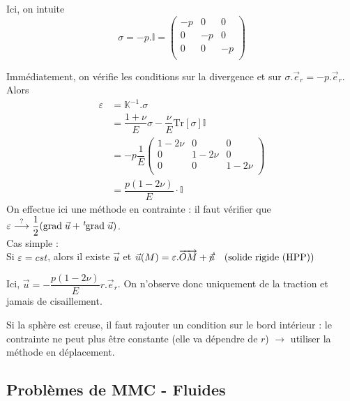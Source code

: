 \documentclass{article}
\newcommand{\grad}{\text{grad}\;}
\newcommand{\transpose}{\hspace{.1em}{}^t\hspace{-.1em}}
\begin{document}
\begin{enumerate}
Ici, on intuite
\[
\sigma = -p.\mathbb{I} =
\begin{pmatrix}
-p & 0 & 0\\
0 & -p & 0\\
0 & 0 & -p\\
\end{pmatrix}
\]

Immédiatement, on vérifie les conditions sur la divergence et sur $\sigma.\vec{e}_r = -p.\vec{e}_r$.
Alors 
\begin{align*}
\varepsilon & = \mathbb{K}^{-1}.\sigma\\
& = \dfrac{1+\nu}{E}\sigma - \dfrac{\nu}{E}\text{Tr}[\sigma]\mathbb{I}\\
& = -p\dfrac{1}{E}
\begin{pmatrix}
1 - 2\nu & 0 & 0\\
0 & 1-2\nu & 0\\
0 & 0 & 1-2\nu\\
\end{pmatrix}\\
& = \dfrac{p(1-2\nu)}{E}\cdot\mathbb{I}
\end{align*}
On effectue ici une méthode en contrainte : il faut vérifier que $\varepsilon \overset{?}{\longrightarrow} \dfrac{1}{2} (\grad\vec{u} + \transpose\grad\vec{u})$.\\
Cas simple :\\
Si $\varepsilon = cst$, alors il existe $\vec{u}$ et $\vec{u}(M) = \varepsilon.\overrightarrow{OM} + \cancel{\vec{u}} \quad \text{(solide rigide (HPP))}$

Ici, $\vec{u}=-\dfrac{p(1-2\nu)}{E}r.\vec{e}_r$. On n'observe donc uniquement de la traction et jamais de cisaillement.
\bigskip

Si la sphère est creuse, il faut rajouter un condition sur le bord intérieur : le contrainte ne peut plus être constante (elle va dépendre de $r$) $\to$ utiliser la méthode en déplacement.
\end{enumerate}

\subsection{Problèmes de MMC - Fluides}
\end{document}
